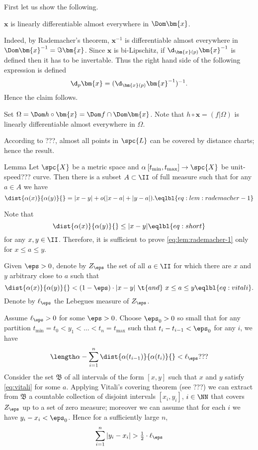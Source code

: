 First let us show the following.

\begin{clm}{}
$\bm{x}$ is linearly differentiable almost everywhere in $\Dom \bm{x}$.
\end{clm}


Indeed, by Rademacher's theorem,
$\bm{x}^{-1}$ is differentiable almost everywhere in $\Dom\bm{x}^{-1}=\Im \bm{x}$.
Since $\bm{x}$ is bi-Lipschitz,  
if $\d_{\bm{x}(p)}\bm{x}^{-1}$ is defined then it has to be invertable.
Thus the right hand side of the following expression is defined
\[\d_p\bm{x}
=
(\d_{\bm{x}(p)}\bm{x}^{-1})^{-1}.\]
Hence the claim follows. 
\claimqeds

Set $\Omega=\Dom h\circ \bm{x}=\Dom f\cap \Dom \bm{x}$.
Note that $h\circ \bm{x}=(f|\Omega)$ is linearly differentiable almost everywhere in $\Omega$.

According to ???, almost all points in $\spc{L}$ can be covered by distance charts;
hence the result.
\qeds


\begin{thm}{Lemma}
Let $\spc{X}$ be a metric space 
and $\alpha\:[t_{\min},t_{\max}]\to\spc{X}$ be unit-speed??? curve.
Then there is a subset $A\subset \II$ of full measure 
such that for any $a\in A$ we have 
\[\dist{\alpha(x)}{\alpha(y)}{}=|x-y|+o(|x-a|+|y-a|).
\eqlbl{eq:lem:rademacher-1}\]
\end{thm}

Note that
\[\dist{\alpha(x)}{\alpha(y)}{}\le|x-y|
\eqlbl{eq:short}
\]
for any $x,y\in\II$.
Therefore, it is sufficient to prove \ref{eq:lem:rademacher-1} only for $x\le a\le y$.

Given $\eps>0$, denote by $Z_{\eps}$
the set of all $a\in\II$ for which 
there are $x$ and $y$ arbitrary close to $a$
such that 
\[\dist{\alpha(x)}{\alpha(y)}{}<(1-\eps)\cdot|x-y|
\ \t{and}\ 
x\le a\le y
\eqlbl{eq:vitali}.\]
Denote by $\ell_\eps$ the Lebegues measure of $Z_\eps$.

Assume $\ell_\eps>0$ for some $\eps>0$. 
Choose $\eps_0>0$ so small that for
any partition $t_{\min}= t_0 < y_1 <\dots <t_n = t_{\max}$ such that $t_i-t_{i-1}<\eps_0$ for any $i$, 
we have
\[
\length\alpha
-
\sum_{i=1}^n\dist{\alpha(t_{i-1})}{\alpha(t_i)}{}
<
\ell_\eps???
\]
Consider the set $\mathfrak B$ of all intervals of
the form $[x,y]$ such that $x$ and $y$ satisfy \ref{eq:vitali} for some $a$.
Applying Vitali's covering theorem (see ???)
we can extract from $\mathfrak B$ a countable collection of disjoint
intervals $[x_i,y_i]$, $i\in\NN$ that covers $Z_\eps$ up to a set of zero measure;
moreover we can assume that for each $i$ we have $y_i-x_i<\eps_0$. 
Hence for a sufficiently large $n$, 
\[\sum_{i=1}^n|y_i-x_i|>\tfrac12\cdot\ell_\eps\]

